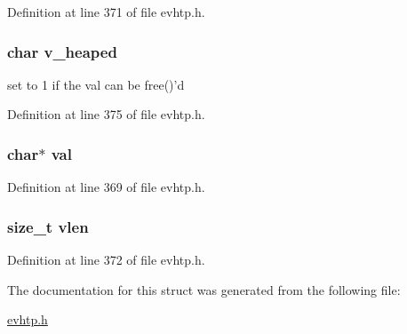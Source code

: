 Definition at line 371 of file evhtp.\-h.

\hypertarget{structevhtp__kv__s_a220b69df8f7b820814ebda4c2df899d8}{
\subsubsection[{v\-\_\-heaped}]{\setlength{\rightskip}{0pt plus 5cm}char v\-\_\-heaped}}\label{structevhtp__kv__s_a220b69df8f7b820814ebda4c2df899d8}
set to 1 if the val can be free()'d 

Definition at line 375 of file evhtp.\-h.

\hypertarget{structevhtp__kv__s_a1d80a43cb41e5b550d4563dd10d302bc}{
\subsubsection[{val}]{\setlength{\rightskip}{0pt plus 5cm}char$\ast$ val}}\label{structevhtp__kv__s_a1d80a43cb41e5b550d4563dd10d302bc}


Definition at line 369 of file evhtp.\-h.

\hypertarget{structevhtp__kv__s_ac59966c92d67690ef79403b9b2feab88}{
\subsubsection[{vlen}]{\setlength{\rightskip}{0pt plus 5cm}size\-\_\-t vlen}}\label{structevhtp__kv__s_ac59966c92d67690ef79403b9b2feab88}


Definition at line 372 of file evhtp.\-h.



The documentation for this struct was generated from the following file\-:\begin{DoxyCompactItemize}
\item 
\hyperlink{evhtp_8h}{evhtp.\-h}\end{DoxyCompactItemize}
